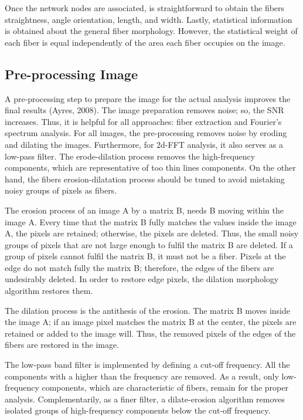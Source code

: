 \documentclass[12pt,a4paper]{article}
\begin{document}
Once the network nodes are associated, is straightforward to obtain the fibers straightness, angle orientation, length, and width. Lastly,  statistical information is obtained about the general fiber morphology. However, the statistical weight of each fiber is equal independently of the area each  fiber occupies on the image. 

\subsection{Pre-processing Image}
A pre-processing step to prepare the image for the actual analysis improves the final results (Ayres, 2008). The image preparation removes noise; so, the SNR increases. Thus, it is helpful for all approaches: fiber extraction and Fourier’s spectrum analysis.  For all images, the pre-processing removes noise by eroding and dilating the images. Furthermore, for 2d-FFT analysis, it also serves as a low-pass filter.  The erode-dilation process removes the high-frequency components, which are representative of too thin lines components. On the other hand, the fibers erosion-dilatation process should be tuned to avoid mistaking noisy groups of pixels as fibers.

The erosion process of an image A by a matrix B, needs B moving within the image A. Every time that the matrix B fully matches the values inside the image A, the pixels are retained; otherwise, the pixels are deleted. Thus, the small noisy groups of pixels that are not large enough to fulfil the matrix B are deleted. If a group of pixels cannot fulfil the matrix B, it must not be a fiber.  Pixels at the edge do not match fully the matrix B; therefore, the edges of the fibers are undesirably deleted. In order to restore edge pixels, the dilation morphology algorithm restores them.  

The dilation process is the antithesis of the erosion. The matrix B moves inside the image A; if an image pixel matches the matrix B at the center, the pixels are retained or added to the image will. Thus, the removed pixels of the edges of the fibers are restored in the image.

The low-pass band filter is implemented by defining a cut-off frequency. All the components with a higher than the frequency are removed. As a result, only low-frequency components, which are characteristic of fibers, remain for the proper analysis.  Complementarily, as a finer filter, a dilate-erosion algorithm removes isolated groups of high-frequency components below the cut-off frequency.
\end{document}
